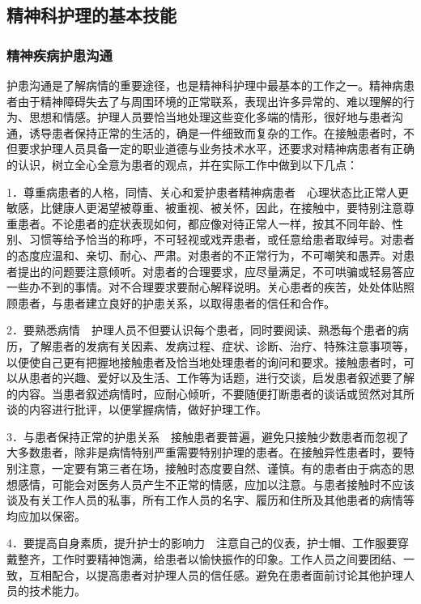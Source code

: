\subsection{精神科护理的基本技能}

\subsubsection{精神疾病护患沟通}

护患沟通是了解病情的重要途径，也是精神科护理中最基本的工作之一。精神病患者由于精神障碍失去了与周围环境的正常联系，表现出许多异常的、难以理解的行为、思想和情感。护理人员要恰当地处理这些变化多端的情形，很好地与患者沟通，诱导患者保持正常的生活的，确是一件细致而复杂的工作。在接触患者时，不但要求护理人员具备一定的职业道德与业务技术水平，还要求对精神病患者有正确的认识，树立全心全意为患者的观点，并在实际工作中做到以下几点：

1．尊重病患者的人格，同情、关心和爱护患者精神病患者　心理状态比正常人更敏感，比健康人更渴望被尊重、被重视、被关怀，因此，在接触中，要特别注意尊重患者。不论患者的症状表现如何，都应像对待正常人一样，按其不同年龄、性别、习惯等给予恰当的称呼，不可轻视或戏弄患者，或任意给患者取绰号。对患者的态度应温和、亲切、耐心、严肃。对患者的不正常行为，不可嘲笑和愚弄。对患者提出的问题要注意倾听。对患者的合理要求，应尽量满足，不可哄骗或轻易答应一些办不到的事情。对不合理要求要耐心解释说明。关心患者的疾苦，处处体贴照顾患者，与患者建立良好的护患关系，以取得患者的信任和合作。

2．要熟悉病情　护理人员不但要认识每个患者，同时要阅读、熟悉每个患者的病历，了解患者的发病有关因素、发病过程、症状、诊断、治疗、特殊注意事项等，以便使自己更有把握地接触患者及恰当地处理患者的询问和要求。接触患者时，可以从患者的兴趣、爱好以及生活、工作等为话题，进行交谈，启发患者叙述要了解的内容。当患者叙述病情时，应耐心倾听，不要随便打断患者的谈话或贸然对其所谈的内容进行批评，以便掌握病情，做好护理工作。

3．与患者保持正常的护患关系　接触患者要普遍，避免只接触少数患者而忽视了大多数患者，除非是病情特别严重需要特别护理的患者。在接触异性患者时，要特别注意，一定要有第三者在场，接触时态度要自然、谨慎。有的患者由于病态的思想感情，可能会对医务人员产生不正常的情感，应加以注意。与患者接触时不应该谈及有关工作人员的私事，所有工作人员的名字、履历和住所及其他患者的病情等均应加以保密。

4．要提高自身素质，提升护士的影响力　注意自己的仪表，护士帽、工作服要穿戴整齐，工作时要精神饱满，给患者以愉快振作的印象。工作人员之间要团结、一致，互相配合，以提高患者对护理人员的信任感。避免在患者面前讨论其他护理人员的技术能力。

